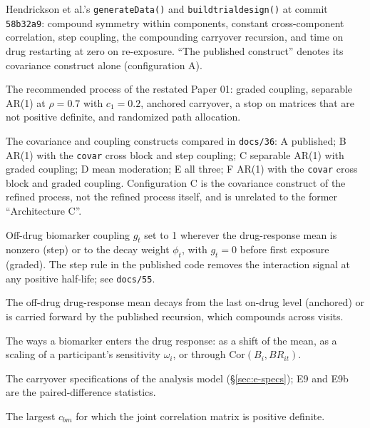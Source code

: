 \documentclass[11pt]{article}
\newcommand{\code}[1]{\texttt{#1}}
\begin{document}
\begin{description}[itemsep=1pt,leftmargin=1.5em,style=nextline]
\item[The published process] Hendrickson et al.'s \code{generateData()}
  and \code{buildtrialdesign()} at commit \code{58b32a9}: compound
  symmetry within components, constant cross-component correlation,
  step coupling, the compounding carryover recursion, and time on drug
  restarting at zero on re-exposure. ``The published construct''
  denotes its covariance construct alone (configuration A).
\item[The refined process] The recommended process of the restated
  Paper 01: graded coupling, separable AR(1) at $\rho = 0.7$ with
  $c_1 = 0.2$, anchored carryover, a stop on matrices that are not
  positive definite, and randomized path allocation.
\item[Configurations A to F] The covariance and coupling constructs
  compared in \code{docs/36}: A published; B AR(1) with the
  \code{covar} cross block and step coupling; C separable AR(1) with
  graded coupling; D mean moderation; E all three; F AR(1) with the
  \code{covar} cross block and graded coupling. Configuration C is the
  covariance construct of the refined process, not the refined process
  itself, and is unrelated to the former ``Architecture C''.
\item[Step and graded coupling] Off-drug biomarker coupling $g_t$ set
  to 1 wherever the drug-response mean is nonzero (step) or to the
  decay weight $\phi_t$, with $g_t = 0$ before first exposure (graded).
  The step rule in the published code removes the interaction signal at
  any positive half-life; see \code{docs/55}.
\item[Anchored and compounding carryover] The off-drug drug-response
  mean decays from the last on-drug level (anchored) or is carried
  forward by the published recursion, which compounds across visits.
\item[Mean, sensitivity and covariance binding] The ways a biomarker
  enters the drug response: as a shift of the mean, as a scaling of a
  participant's sensitivity $\omega_i$, or through $\mathrm{Cor}(B_i,
  BR_{it})$.
\item[E1 to E9] The carryover specifications of the analysis model
  (\S\ref{sec:e-specs}); E9 and E9b are the paired-difference
  statistics.
\item[Coupling ceiling] The largest $c_{bm}$ for which the joint
  correlation matrix is positive definite.
\end{description}
\end{document}

